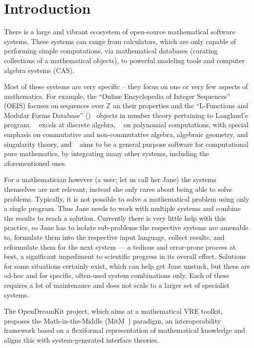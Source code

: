\section{Introduction}\label{sec:intro}

There is a large and vibrant ecosystem of open-source mathematical software systems. 
These systems can range from calculators, which are only capable of performing simple computations, via mathematical databases (curating collections of a mathematical objects), to powerful modeling tools and computer algebra systems (CAS).

Most of these systems are very specific -- they focus on one or very few aspects of
mathematics.  For example, the ``Online Encyclopedia of Integer Sequences'' (OEIS) focuses
on sequences over $\mathbb{Z}$ an their properties and the ``L-Functions and Modular Forms
Database'' (\LMFDB)~\cite{lmfdb:on} objects in number theory pertaining to
Langland's program.  \GAP~\cite{GAP:on} excels at discrete algebra,
\Singular~\cite{singular:on} on polynomial computations, with special emphasis on
commutative and non-commutative algebra, algebraic geometry, and singularity theory, and
\Sage~\cite{SageMath:on} aims to be a general purpose software for computational pure
mathematics, by integrating many other systems, including the aforementioned ones.

For a mathematician however (a user; let us call her Jane) the systems themselves are not relevant; instead she only cares about being able to solve problems. 
Typically, it is not possible to solve a mathematical problem using only a single program. 
Thus Jane needs to work with multiple systems and combine the results to reach a solution. 
Currently there is very little help with this practice, so Jane has to isolate sub-problems the respective systems are amenable to, formulate them into the respective input language, collect results, and reformulate them for the next system --- a tedious and error-prone process at best, a significant impediment to scientific progress in its overall effect. 
Solutions for some situations certainly exist, which can help get Jane unstuck, but these are ad-hoc and for specific, often-used system combinations only. 
Each of these requires a lot of maintenance and does not scale to a larger set of specialist systems. 

The OpenDreamKit project, which aims at a mathematical VRE toolkit, proposes the Math-in-the-Middle (MitM~\cite{DehKohKon:iop16}) paradigm, an interoperability framework based on a flexiformal representation of mathematical knowledge and aligns this with system-generated interface theories. 

